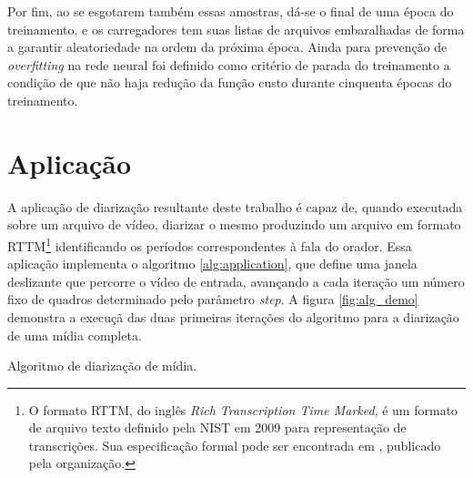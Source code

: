 Por fim, ao se esgotarem também essas amostras, dá-se o final de uma época do treinamento, e os carregadores tem suas listas de arquivos embaralhadas de forma a garantir aleatoriedade na ordem da próxima época.
Ainda para prevenção de \textit{overfitting} na rede neural foi definido como critério de parada do treinamento a condição de que não haja redução da função custo durante cinquenta épocas do treinamento.

\section{Aplicação}
\label{sec:application}

A aplicação de diarização resultante deste trabalho é capaz de, quando executada sobre um arquivo de vídeo, diarizar o mesmo produzindo um arquivo em formato RTTM\footnote{O formato RTTM, do inglês \textit{Rich Transcription Time Marked}, é um formato de arquivo texto definido pela NIST em 2009 para representação de transcrições. Sua especificação formal pode ser encontrada em \cite{nist2009RT09Rich2009}, publicado pela organização.} identificando os períodos correspondentes à fala do orador. 
Essa aplicação implementa o algoritmo \ref{alg:application}, que define uma janela deslizante que percorre o vídeo de entrada, avançando a cada iteração um número fixo de quadros determinado pelo parâmetro \textit{step}.
A figura \ref{fig:alg_demo} demonstra a execuçã das duas primeiras iterações do algoritmo para a diarização de uma mídia completa.

\begin{algorithm}[ht]
    \SetAlgoLined
    \caption{Algoritmo de diarização de mídia.}
    \label{alg:application}
\end{algorithm}

